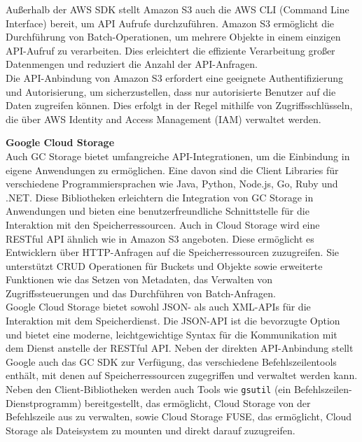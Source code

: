 Außerhalb der AWS SDK stellt Amazon S3 auch die AWS CLI (Command Line Interface) bereit, um API Aufrufe durchzuführen. Amazon S3 ermöglicht die Durchführung von Batch-Operationen, um mehrere Objekte in einem einzigen API-Aufruf zu verarbeiten. Dies erleichtert die effiziente Verarbeitung großer Datenmengen und reduziert die Anzahl der API-Anfragen.\\

Die API-Anbindung von Amazon S3 erfordert eine geeignete Authentifizierung und Autorisierung, um sicherzustellen, dass nur autorisierte Benutzer auf die Daten zugreifen können. Dies erfolgt in der Regel mithilfe von Zugriffsschlüsseln, die über AWS Identity and Access Management (IAM) verwaltet werden.

\newpage

\textbf{Google Cloud Storage}\\

Auch GC Storage bietet umfangreiche API-Integrationen, um die Einbindung in eigene Anwendungen zu ermöglichen. Eine davon sind die Client Libraries für verschiedene Programmiersprachen wie Java, Python, Node.js, Go, Ruby und .NET. Diese Bibliotheken erleichtern die Integration von GC Storage in Anwendungen und bieten eine benutzerfreundliche Schnittstelle für die Interaktion mit den Speicherressourcen. Auch in Cloud Storage wird eine RESTful API ähnlich wie in Amazon S3 angeboten. Diese ermöglicht es Entwicklern über HTTP-Anfragen auf die Speicherressourcen zuzugreifen. Sie unterstützt CRUD Operationen für Buckets und Objekte sowie erweiterte Funktionen wie das Setzen von Metadaten, das Verwalten von Zugriffssteuerungen und das Durchführen von Batch-Anfragen.\\

Google Cloud Storage bietet sowohl JSON- als auch XML-APIs für die Interaktion mit dem Speicherdienst. Die JSON-API ist die bevorzugte Option und bietet eine moderne, leichtgewichtige Syntax für die Kommunikation mit dem Dienst anstelle der RESTful API. Neben der direkten API-Anbindung stellt Google auch das GC SDK zur Verfügung, das verschiedene Befehlszeilentools enthält, mit denen auf Speicherressourcen zugegriffen und verwaltet werden kann. Neben den Client-Bibliotheken werden auch Tools wie \verb|gsutil| (ein Befehlszeilen-Dienstprogramm) bereitgestellt, das ermöglicht, Cloud Storage von der Befehlszeile aus zu verwalten, sowie Cloud Storage FUSE, das ermöglicht, Cloud Storage als Dateisystem zu mounten und direkt darauf zuzugreifen.\\

